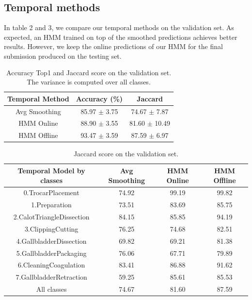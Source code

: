 \documentclass[10pt,twocolumn,letterpaper]{article}
\begin{document}
\subsection{Temporal methods}

In table 2 and 3, we compare our temporal methods on the validation set. As expected, an HMM trained on top of the smoothed predictions achieves better results. However, we keep the online predictions of our HMM for the final submission produced on the testing set.

\begin{table}
	\begin{center}
		\begin{tabular}{|c|c|c|}
			\hline
			Temporal Method & Accuracy (\%) & Jaccard \\
			\hline\hline
			Avg Smoothing & 85.97 $\pm$ 3.75 & 74.67 $\pm$ 7.87\\
			HMM Online & 88.90 $\pm$ 3.55 & 81.60 $\pm$ 10.49\\
			HMM Offline & 93.47 $\pm$ 3.59 & 87.59 $\pm$ 6.97\\
			\hline
		\end{tabular}
	\end{center}
	\caption{Accuracy Top1 and Jaccard score on the validation set. The variance is computed over all classes.}
\end{table}


\begin{table}
	\begin{center}
		\begin{tabular}{|c|c|c|c|}
			\hline
			Temporal Model by classes & Avg Smoothing & HMM Online & HMM Offline \\
			\hline \hline
			0.TrocarPlacement & 74.92 & 99.19 & 99.82 \\
			1.Preparation & 73.51 & 83.69 & 85.75 \\
			2.CalotTriangleDissection & 84.15 & 85.85 &  94.19 \\
			3.ClippingCutting & 76.25 & 74.68 & 82.51 \\
			4.GallbladderDissection & 69.82 & 69.21 & 81.38 \\
			5.GallbladderPackaging & 76.06 & 67.71 & 79.89 \\
			6.CleaningCoagulation & 83.41 & 86.88 & 91.62 \\
			7.GallbladderRetraction & 59.25 & 85.61 & 85.53 \\
			\hline
			All classes & 74.67 & 81.60 & 87.59 \\
			\hline
		\end{tabular}
	\end{center}
	\caption{Jaccard score on the validation set.}
\end{table}
\end{document}
